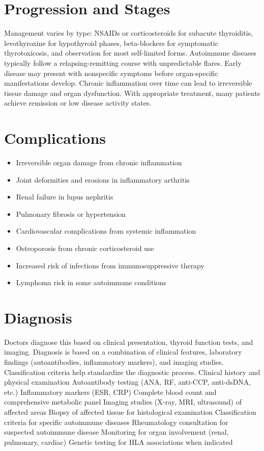 \section{Progression and Stages}
Management varies by type: NSAIDs or corticosteroids for subacute thyroiditis, levothyroxine for hypothyroid phases, beta-blockers for symptomatic thyrotoxicosis, and observation for most self-limited forms. Autoimmune diseases typically follow a relapsing-remitting course with unpredictable flares. Early disease may present with nonspecific symptoms before organ-specific manifestations develop. Chronic inflammation over time can lead to irreversible tissue damage and organ dysfunction. With appropriate treatment, many patients achieve remission or low disease activity states.
\section{Complications}
\begin{itemize}[noitemsep]
  \item Irreversible organ damage from chronic inflammation
  \item Joint deformities and erosions in inflammatory arthritis
  \item Renal failure in lupus nephritis
  \item Pulmonary fibrosis or hypertension
  \item Cardiovascular complications from systemic inflammation
  \item Osteoporosis from chronic corticosteroid use
  \item Increased risk of infections from immunosuppressive therapy
  \item Lymphoma risk in some autoimmune conditions
\end{itemize}
\section{Diagnosis}
Doctors diagnose this based on clinical presentation, thyroid function tests, and imaging. Diagnosis is based on a combination of clinical features, laboratory findings (autoantibodies, inflammatory markers), and imaging studies. Classification criteria help standardize the diagnostic process. Clinical history and physical examination Autoantibody testing (ANA, RF, anti-CCP, anti-dsDNA, etc.) Inflammatory markers (ESR, CRP) Complete blood count and comprehensive metabolic panel Imaging studies (X-ray, MRI, ultrasound) of affected areas Biopsy of affected tissue for histological examination Classification criteria for specific autoimmune diseases Rheumatology consultation for suspected autoimmune disease Monitoring for organ involvement (renal, pulmonary, cardiac) Genetic testing for HLA associations when indicated


